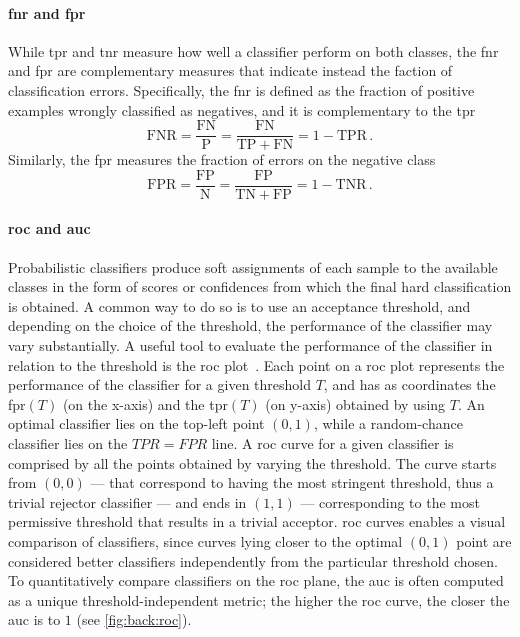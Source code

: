 \paragraph{\acrshort{fnr} and \acrshort{fpr}}
While \gls{tpr} and \gls{tnr} measure how well a classifier perform on both classes, the \gls{fnr} and \gls{fpr} are complementary measures that indicate instead the faction of classification errors.
Specifically, the \gls{fnr} is defined as the fraction of positive examples wrongly classified as negatives, and it is complementary to the \gls{tpr}
\begin{equation} \label{eq:back:fnr}
    \mathrm{FNR} = \frac{\mathrm{FN}}{\mathrm{P}} = \frac{\mathrm{FN}}{\mathrm{TP} + \mathrm{FN}} = 1 - \mathrm{TPR}\,.
\end{equation}
Similarly, the \gls{fpr} measures the fraction of errors on the negative class
\begin{equation} \label{eq:back:fpr}
    \mathrm{FPR} = \frac{\mathrm{FP}}{\mathrm{N}} = \frac{\mathrm{FP}}{\mathrm{TN} + \mathrm{FP}} = 1 - \mathrm{TNR}\,.
\end{equation}

\paragraph{\acrshort{roc} and \acrshort{auc}}
Probabilistic classifiers produce soft assignments of each sample to the available classes in the form of scores or confidences from which the final hard classification is obtained.
A common way to do so is to use an acceptance threshold, and depending on the choice of the threshold, the performance of the classifier may vary substantially.
A useful tool to evaluate the performance of the classifier in relation to the threshold is the \gls{roc} plot~\cite{fawcett2006introduction}.
Each point on a \gls{roc} plot represents the performance of the classifier for a given threshold $T$, and has as coordinates the \gls{fpr}$(T)$ (on the x-axis) and the \gls{tpr}$(T)$ (on y-axis) obtained by using $T$.
An optimal classifier lies on the top-left point $(0,1)$, while a random-chance classifier lies on the $TPR = FPR$ line.
A \gls{roc} curve for a given classifier is comprised by all the points obtained by varying the threshold.
The curve starts from $(0,0)$ --- that correspond to having the most stringent threshold, thus a trivial rejector classifier --- and ends in $(1,1)$ --- corresponding to the most permissive threshold that results in a trivial acceptor.
\Gls{roc} curves enables a visual comparison of classifiers, since curves lying closer to the optimal $(0,1)$ point are considered better classifiers independently from the particular threshold chosen.
To quantitatively compare classifiers on the \gls{roc} plane, the \gls{auc} is often computed as a unique threshold-independent metric;
the higher the \gls{roc} curve, the closer the \gls{auc} is to $1$ (see \ref{fig:back:roc}).

